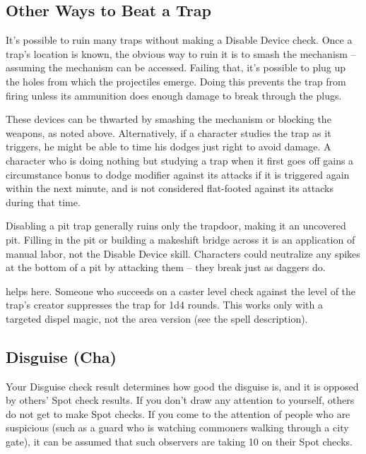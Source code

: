 \begin{figure*}[hbt!]
\subsection{Other Ways to Beat a Trap}
It's possible to ruin many traps without making a Disable Device check.
 Once a trap's location is known, the obvious way to ruin it is to smash the mechanism -- assuming the mechanism can be accessed. Failing that, it's possible to plug up the holes from which the projectiles emerge. Doing this prevents the trap from firing unless its ammunition does enough damage to break through the plugs.

 These devices can be thwarted by smashing the mechanism or blocking the weapons, as noted above. Alternatively, if a character studies the trap as it triggers, he might be able to time his dodges just right to avoid damage. A character who is doing nothing but studying a trap when it first goes off gains a  circumstance bonus to dodge modifier against its attacks if it is triggered again within the next minute, and is not considered flat-footed against its attacks during that time.

 Disabling a pit trap generally ruins only the trapdoor, making it an uncovered pit. Filling in the pit or building a makeshift bridge across it is an application of manual labor, not the Disable Device skill. Characters could neutralize any spikes at the bottom of a pit by attacking them -- they break just as daggers do.

  helps here. Someone who succeeds on a caster level check against the level of the trap's creator suppresses the trap for 1d4 rounds. This works only with a targeted dispel magic, not the area version (see the spell description).
\end{figure*}

\subsection{Disguise (Cha)}
 Your Disguise check result determines how good the disguise is, and it is opposed by others' Spot check results. If you don't draw any attention to yourself, others do not get to make Spot checks. If you come to the attention of people who are suspicious (such as a guard who is watching commoners walking through a city gate), it can be assumed that such observers are taking 10 on their Spot checks.

